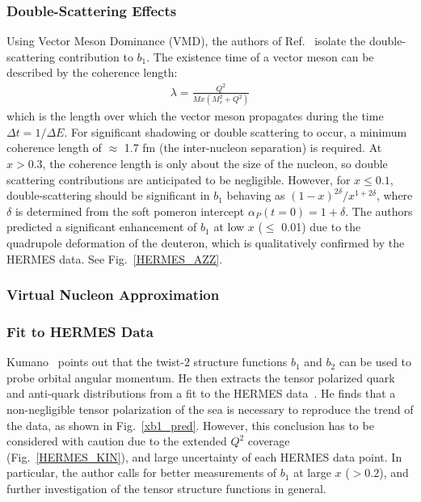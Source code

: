 \subsubsection{Double-Scattering Effects}
Using Vector Meson Dominance (VMD), the authors of Ref.~\cite{Bora:1997pi} isolate the 
double-scattering contribution to $b_1$. The existence time of a vector meson can 
be described by the coherence length: %
\begin{eqnarray}
\lambda = \frac{Q^2}{M x (M_v^2 + Q^2)}
\end{eqnarray}
which is the length over which the vector meson propagates during the time $\Delta t 
= 1/\Delta E$. For significant shadowing or double scattering to occur, a minimum coherence length 
of $\approx$ 1.7 fm (the inter-nucleon separation) is required. At 
$x > 0.3$, the coherence length is only about the size of the nucleon, so double
scattering contributions are anticipated to be negligible. However, for $x \le 0.1$, 
double-scattering should be significant in $b_1$ behaving as $(1-x)^{2\delta}/x^{1+2\delta}$, 
where $\delta$ is determined from the soft pomeron intercept $\alpha_P(t=0) = 1 + \delta$.
The authors predicted a significant enhancement of $b_1$ at low $x$ ($\le$ 0.01) 
due to the quadrupole deformation of the deuteron, which is qualitatively confirmed by the
HERMES data.  See Fig.~\ref{HERMES_AZZ}.

\subsubsection{Virtual Nucleon Approximation}
  

\subsubsection{Fit to HERMES  Data}
Kumano~\cite{Kumano:2010vz} points out that the twist-2 structure functions $b_1$ and $b_2$ can be used to probe orbital angular momentum.  
He then extracts the tensor polarized quark and anti-quark distributions from a fit to the HERMES data~\cite{Airapetian:2005cb}. 
He finds that a non-negligible tensor polarization of the sea is necessary to reproduce the trend of
the data, as shown in Fig.~\ref{xb1_pred}. However, this conclusion has to be considered with caution due to the extended
$Q^2$ coverage (Fig.~\ref{HERMES_KIN}), and large uncertainty of each HERMES data point.
In particular, the author calls for better measurements of $b_1$ at large $x$ ($>0.2$), and further investigation of
the tensor structure functions in general.

